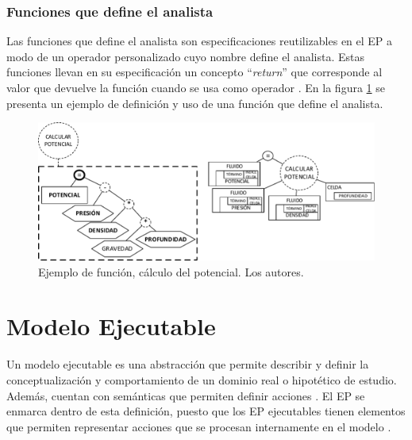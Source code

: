 \subsubsection{Funciones que define el analista}
Las funciones que define el analista son especificaciones reutilizables en el EP a modo de un operador personalizado cuyo nombre define el analista. Estas funciones llevan en su especificación un concepto ``\textit{return}'' que corresponde al valor que devuelve la función cuando se usa como operador \citep{JCalle}. En la figura \ref{fig:Potencial} se presenta un ejemplo de definición y uso de una función que define el analista.

\begin{figure}[h]
	\centering%
	\includegraphics[scale=0.8]{Fig/EjFuncion.pdf}%
	\caption[Ejemplo de función, cálculo del potencial.]{Ejemplo de función, cálculo del potencial. Los autores.} \label{fig:Potencial}
\end{figure}

\section{Modelo Ejecutable}\label{sec:Executable}
Un modelo ejecutable es una abstracción que permite describir y definir la conceptualización y comportamiento de un dominio real o hipotético de estudio. Además, cuentan con semánticas que permiten definir acciones \citep{ExecutableUML}. El EP se enmarca dentro de esta definición, puesto que los EP ejecutables tienen elementos que permiten representar acciones que se procesan internamente en el modelo \citep{JChaverra}. 